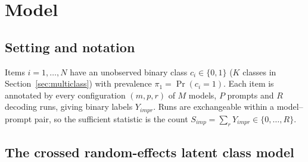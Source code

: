 \section{Model}\label{sec:model}

\subsection{Setting and notation}

Items $i = 1, \dots, N$ have an unobserved binary class $c_i \in \{0, 1\}$ ($K$ classes in
Section~\ref{sec:multiclass}) with prevalence $\pi_1 = \Pr(c_i = 1)$. Each item is
annotated by every configuration $(m, p, r)$ of $M$ models, $P$ prompts and $R$ decoding
runs, giving binary labels $Y_{impr}$. Runs are exchangeable within a model--prompt pair,
so the sufficient statistic is the count $S_{imp} = \sum_{r} Y_{impr} \in \{0, \dots, R\}$.

\subsection{The crossed random-effects latent class model}

